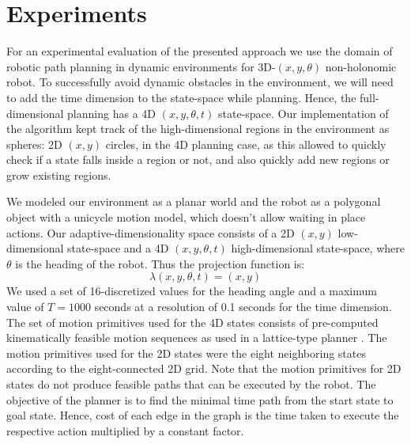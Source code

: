 \fi

\section{Experiments}
\label{sec:ppad-exp}
For an experimental evaluation of the presented approach we use the domain of robotic path planning in dynamic environments for 3D-$(x,y,\theta)$ non-holonomic robot. To successfully avoid dynamic obstacles in the environment, we will need to add the time dimension to the state-space while planning. Hence, the full-dimensional planning has a 4D $(x,y,\theta,t)$ state-space. Our implementation of the algorithm kept track of the high-dimensional regions in the environment as spheres: 2D $(x,y)$ circles, in the 4D planning case, as this allowed to quickly check if a state falls inside a region or not, and also quickly add new regions or grow existing regions. 

We modeled our environment as a planar world and the robot as a polygonal object with a unicycle motion model, which doesn't allow waiting in place actions. Our adaptive-dimensionality space consists of a 2D $(x,y)$ low-dimensional state-space and a 4D $(x,y,\theta,t)$ high-dimensional state-space, where $\theta$  is the heading of the robot. Thus the projection function is:
$$ \lambda(x,y,\theta,t) = (x,y)$$
We used a set of 16-discretized values for the heading angle and a maximum value of $T = 1000$ seconds at a resolution of 0.1 seconds for the time dimension. The set of motion primitives used for the 4D states consists of pre-computed kinematically feasible motion sequences as used in a lattice-type planner \cite{likhachev2009planning}. The motion primitives used for the 2D states were the eight neighboring states according to the eight-connected 2D grid. Note that the motion primitives for 2D states do not produce feasible paths that can be executed by the robot. The objective of the planner is to find the minimal time path from the start state to goal state. Hence, cost of each edge in the graph is the time taken to execute the respective action multiplied by a constant factor. 


